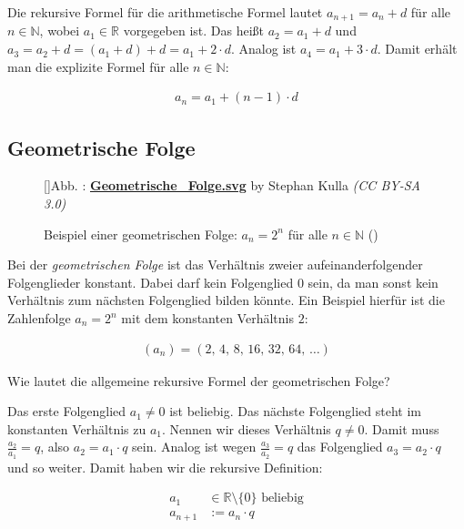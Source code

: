 \documentclass[fontsize=9pt,
               parskip=half-,
               DIV=14,
               listof=chapterentry,
               tocflat]{scrbook}
\newcounter{imagelabel}
\begin{document}
\begin{answer*}
Die rekursive Formel für die arithmetische Formel lautet $a_{n+1}=a_{n}+d$ für alle $n\in \mathbb {N} $, wobei $a_{1}\in \mathbb {R} $ vorgegeben ist. Das heißt $a_{2}=a_{1}+d$ und $a_{3}=a_{2}+d=(a_{1}+d)+d=a_{1}+2\cdot d$. Analog ist $a_{4}=a_{1}+3\cdot d$. Damit erhält man die explizite Formel für alle $n\in \mathbb {N} $:

\begin{align*}
a_{n}=a_{1}+(n-1)\cdot d
\end{align*}

\end{answer*}

\subsection{Geometrische Folge}

\begin{figure}[h]
\vspace{\baselineskip}
[]{Abb. : \protect\href{https://commons.wikimedia.org/wiki/File:Geometrische_Folge.svg}{\textbf{Geometrische\allowbreak\_Folge.svg}} by Stephan Kulla \textit{(CC BY-SA 3.0)}}\centering
{}
\caption*{Beispiel einer geometrischen Folge: $a_{n}=2^{n}$ für alle $n\in \mathbb {N} $ ()}
\end{figure}
Bei der \emph{geometrischen Folge} ist das Verhältnis zweier aufeinanderfolgender Folgenglieder konstant. Dabei darf kein Folgenglied 0 sein, da man sonst kein Verhältnis zum nächsten Folgenglied bilden könnte. Ein Beispiel hierfür ist die Zahlenfolge $a_{n}=2^{n}$ mit dem konstanten Verhältnis $2$:

\begin{align*}
\left(a_{n}\right)=(2,\,4,\,8,\,16,\,32,\,64,\,\ldots )
\end{align*}

\begin{mdframed}[style=semanticbox,frametitleaboveskip=3pt,innerbottommargin=3pt,frametitle=Frage]
Wie lautet die allgemeine rekursive Formel der geometrischen Folge?

\end{mdframed}

\begin{answer*}
Das erste Folgenglied $a_{1}\neq 0$ ist beliebig. Das nächste Folgenglied steht im konstanten Verhältnis zu $a_{1}$. Nennen wir dieses Verhältnis $q\neq 0$. Damit muss ${\tfrac {a_{2}}{a_{1}}}=q$, also $a_{2}=a_{1}\cdot q$ sein. Analog ist wegen ${\tfrac {a_{3}}{a_{2}}}=q$ das Folgenglied $a_{3}=a_{2}\cdot q$ und so weiter. Damit haben wir die rekursive Definition:

\begin{align*}
a_{1}&\in \mathbb {R} \setminus \{0\}{\text{ beliebig}}\\a_{n+1}&:=a_{n}\cdot q
\end{align*}

\end{answer*}
\end{document}
